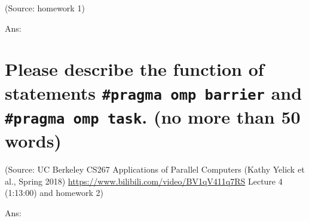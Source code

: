\documentclass{article}
\begin{document}
(Source: homework 1)

Ans:%
~\\
\section{Please describe the function of statements \texttt{\#pragma omp barrier} and \texttt{\#pragma omp task}. (no more than 50 words)}
(Source: UC Berkeley CS267 Applications of Parallel Computers (Kathy Yelick et al., Spring 2018) \url{https://www.bilibili.com/video/BV1qV411q7RS} Lecture 4 (1:13:00) and homework 2)

Ans:%
~\\

\end{document}
